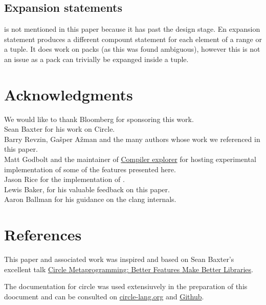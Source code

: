 \documentclass{wg21}
\begin{document}
\subsection{ Expansion statements}

 is not mentioned in this paper because it has past the design stage.
En expansion statement produces a different compount statement for each element of a range or a tuple.
It does work on packs (as this was found ambiguous), however this is not an issue as a pack can trivially be expanged inside a tuple.


\section{Acknowledgments}

We would like to thank Bloomberg for sponsoring this work.\\

Sean Baxter for his work on Circle.\\

Barry Revzin, Gašper Ažman and the many authors whose work we referenced in this paper.\\

Matt Godbolt and the maintainer of \href{compiler-explorer.com}{Compiler explorer} for hosting experimental implementation of some of the features presented here.\\

Jason Rice for the implementation of .\\

Lewis Baker, for his valuable feedback on this paper.\\

Aaron Ballman for his guidance on the clang internals.

\section{References}

This paper and associated work was inspired and based on Sean Baxter's excellent talk
\href{https://www.youtube.com/watch?v=15j4bkipuAg}{Circle Metaprogramming: Better Features Make Better Libraries}.

The documentation for circle was used extensiuvely in the preparation of this doocument and can be consulted on \href{https://www.circle-lang.org/}{circle-lang.org}
and \href{https://github.com/seanbaxter/circle}{Github}.
\end{document}
